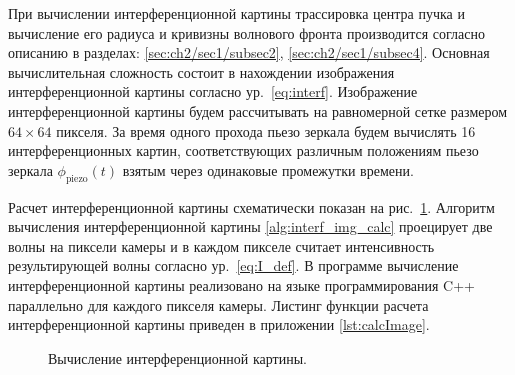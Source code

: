 При вычислении интерференционной картины трассировка центра пучка и вычисление его радиуса и кривизны волнового фронта производится согласно описанию в разделах: \ref{sec:ch2/sec1/subsec2}, \ref{sec:ch2/sec1/subsec4}. Основная вычислительная сложность состоит в нахождении изображения интерференционной картины согласно ур.~\eqref{eq:interf}. Изображение интерференционной картины будем рассчитывать на равномерной сетке размером $64\times64$ пикселя. За время одного прохода пьезо зеркала будем вычислять 16 интерференционных картин, соответствующих различным положениям пьезо зеркала $\phi_{\mathrm{piezo}}(t)$ взятым через одинаковые промежутки времени. 

Расчет интерференционной картины схематически показан на рис.~\ref{fig:wave_front_projection}. Алгоритм вычисления интерференционной картины \ref{alg:interf_img_calc} проецирует две волны на пиксели камеры и в каждом пикселе считает интенсивность результирующей волны согласно ур.~\eqref{eq:I_def}. В программе вычисление интерференционной картины реализовано на языке программирования C++ параллельно для каждого пикселя камеры. Листинг функции расчета интерференционной картины приведен в приложении \ref{lst:calcImage}. 

\begin{figure}[ht]
\caption{Вычисление интерференционной картины.}
\label{fig:wave_front_projection}
\end{figure}

